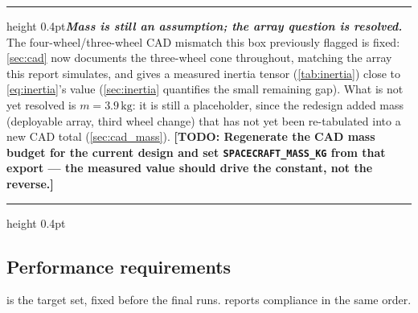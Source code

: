\documentclass[conference,10pt,a4paper]{IEEEtran}
\newcommand{\remarkrule}{\par\nobreak\vspace{2pt}%
  \hrule height 0.4pt\vspace{4pt}\nobreak}
\newenvironment{cautionbox}[1][Caveat]
  {\par\medskip\remarkrule\noindent\small\textbf{\textit{#1.}}\ \ignorespaces}
  {\par\vspace{3pt}\hrule height 0.4pt\par\medskip\ignorespacesafterend}
\newcommand{\TODO}[1]{\textbf{[TODO: #1]}}
\newcommand{\TODO}[1]{}
\newcommand{\unit}[1]{\ensuremath{\,\mathrm{#1}}}
\begin{document}
\begin{cautionbox}[Mass is still an assumption; the array question is resolved]
The four-wheel/three-wheel CAD mismatch this box previously flagged is fixed:
\cref{sec:cad} now documents the three-wheel cone throughout, matching the
array this report simulates, and gives a measured inertia tensor
(\cref{tab:inertia}) close to \cref{eq:inertia}'s value (\cref{sec:inertia}
quantifies the small remaining gap). What is not yet resolved is
$m=3.9\unit{kg}$: it is still a placeholder, since the redesign added mass
(deployable array, third wheel change) that has not yet been re-tabulated
into a new CAD total (\cref{sec:cad_mass}). \TODO{Regenerate the CAD mass
budget for the current design and set \texttt{SPACECRAFT\_MASS\_KG} from
that export --- the measured value should drive the constant, not the
reverse.}
\end{cautionbox}

\subsection{Performance requirements}

 is the target set, fixed before the final runs.
 reports compliance in the same order.
\end{document}
